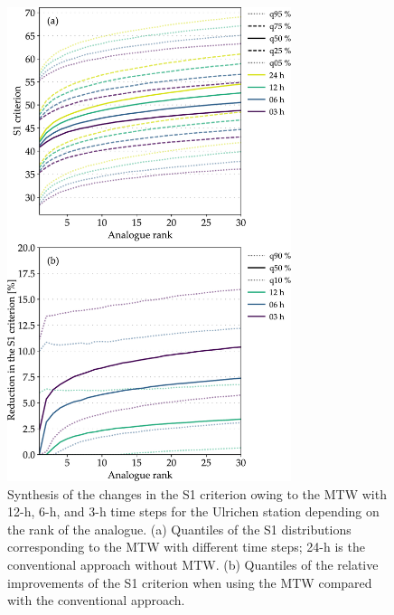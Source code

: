 \documentclass[hess, manuscript]{copernicus}
\begin{document}
	\begin{figure}[htb]
		\begin{center}
			\includegraphics[width=8.3cm]{fig04.pdf}
		\end{center}
		\caption{Synthesis of the changes in the S1 criterion owing to the MTW with 12-h, 6-h, and 3-h time steps for the Ulrichen station depending on the rank of the analogue. (a) Quantiles of the S1 distributions corresponding to the MTW with different time steps; 24-h is the conventional approach without MTW. (b) Quantiles of the relative improvements of the S1 criterion when using the MTW compared with the conventional approach.}
		\label{fig:changes_S1}
	\end{figure}
\end{document}
